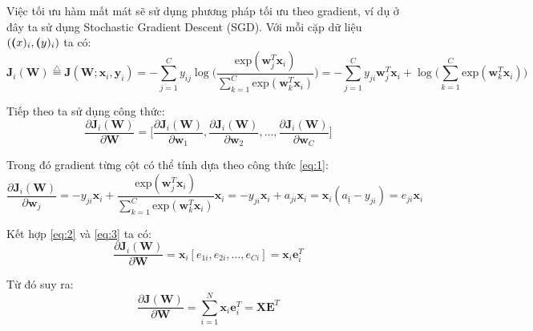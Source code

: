 Việc tối ưu hàm mất mát sẽ sử dụng phương pháp tối ưu theo gradient, ví dụ ở đây ta sử dụng Stochastic Gradient Descent (SGD).
Với mỗi cặp dữ liệu $(\textbf(x)_i, \textbf(y)_i)$ ta có:
\begin{equation} \label{eq:1}
    \textbf{J}_i(\textbf{W}) \stackrel{\bigtriangleup}{=} \textbf{J}(\textbf{W};\textbf{x}_i,\textbf{y}_i) = - \sum^C_{j=1}y_{ij}\log\Big(\frac{\text{exp}(\textbf{w}^T_j\textbf{x}_i)}{\sum^C_{k=1}\text{exp}(\textbf{w}^T_k\textbf{x}_i)}\Big) = - \sum^C_{j=1}y_{ji}\textbf{w}^T_j\textbf{x}_i + \log\Big(\sum^C_{k=1}\text{exp}(\textbf{w}^T_k\textbf{x}_i)\Big)
\end{equation}

Tiếp theo ta sử dụng công thức:
\begin{equation} \label{eq:2}
    \frac{\partial\textbf{J}_i(\textbf{W})}{\partial\textbf{W}} = \Bigg[\frac{\partial\textbf{J}_i(\textbf{W})}{\partial\textbf{w}_1}, \frac{\partial\textbf{J}_i(\textbf{W})}{\partial\textbf{w}_2},\dots,\frac{\partial\textbf{J}_i(\textbf{W})}{\partial\textbf{w}_C}\Bigg]
\end{equation}

Trong đó gradient từng cột có thể tính dựa theo công thức \ref{eq:1}:
\begin{equation}  \label{eq:3}
    \frac{\partial\textbf{J}_i(\textbf{W})}{\partial\textbf{w}_j} = -y_{ji}\textbf{x}_i + \frac{\text{exp}(\textbf{w}^T_j\textbf{x}_i)}{\sum^C_{k=1}\text{exp}(\textbf{w}^T_k\textbf{x}_i)}\textbf{x}_i = -y_{ji}\textbf{x}_i + a_{ji}\textbf{x}_i = \textbf{x}_i(a_{ị}-y_{ji}) = e_{ji}\textbf{x}_i
\end{equation}

Kết hợp \ref{eq:2} và \ref{eq:3} ta có:
\begin{equation*}
    \frac{\partial\textbf{J}_i(\textbf{W})}{\partial\textbf{W}} = \textbf{x}_i[e_{1i},e_{2i},
    \dots,e_{Ci}] = \textbf{x}_i\textbf{e}^T_i
\end{equation*}

Từ đó suy ra:
\begin{equation*}
     \frac{\partial\textbf{J}(\textbf{W})}{\partial\textbf{W}} = \sum^N_{i=1}\textbf{x}_i\textbf{e}^T_i = \textbf{X}\textbf{E}^T
\end{equation*}